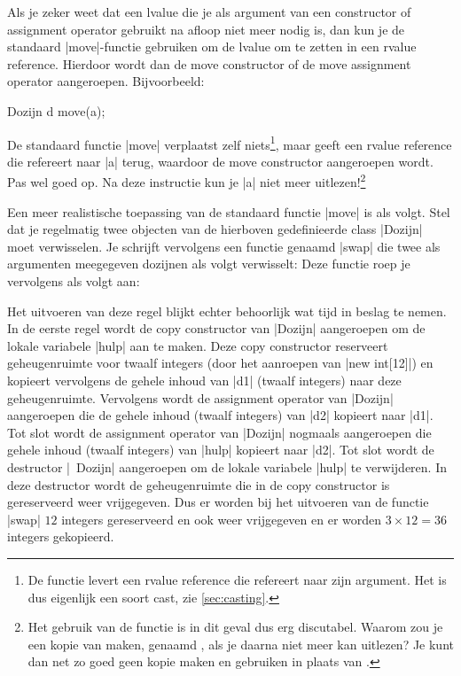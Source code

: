 \begin{cpplstShortInline}
Als je zeker weet dat een lvalue die je als argument van een constructor of assignment operator gebruikt na afloop niet meer nodig is, dan kun je de standaard |move|-functie gebruiken om de lvalue om te zetten in een rvalue reference.
Hierdoor wordt dan de move constructor of de move assignment operator aangeroepen.
Bijvoorbeeld:
\begin{cpplstfragment}
	Dozijn d {move(a)};
\end{cpplstfragment}
De standaard functie \label{std::move}|move| verplaatst zelf niets\footnote{%
	De functie levert een rvalue reference die refereert naar zijn argument. Het is dus eigenlijk een soort cast, zie \cref{sec:casting}.
}, maar geeft een rvalue reference die refereert naar |a| terug, waardoor de move constructor aangeroepen wordt.
Pas wel goed op. Na deze instructie kun je |a| niet meer uitlezen!\footnote{%
	Het gebruik van de functie  is in dit geval dus erg discutabel. Waarom zou je een kopie van  maken, genaamd , als je  daarna niet meer kan uitlezen? Je kunt dan net zo goed geen kopie maken en  gebruiken in plaats van .
} 

Een meer realistische toepassing van de standaard functie |move| is als volgt.
Stel dat je regelmatig twee objecten van de hierboven gedefinieerde class |Dozijn| moet verwisselen.
Je schrijft vervolgens een functie genaamd |swap| die twee als argumenten meegegeven dozijnen als volgt verwisselt:
Deze functie roep je vervolgens als volgt aan:

Het uitvoeren van deze regel blijkt echter behoorlijk wat tijd in beslag te nemen. 
In de eerste regel wordt de copy constructor van |Dozijn| aangeroepen om de lokale variabele |hulp| aan te maken.
Deze copy constructor reserveert geheugenruimte voor twaalf integers (door het aanroepen van |new int[12]|) en kopieert vervolgens de gehele inhoud van |d1| (twaalf integers) naar deze geheugenruimte.
Vervolgens wordt de assignment operator van |Dozijn| aangeroepen die de gehele inhoud (twaalf integers) van |d2| kopieert naar |d1|. Tot slot wordt de assignment operator van |Dozijn| nogmaals aangeroepen die gehele inhoud (twaalf integers) van |hulp| kopieert naar |d2|.
Tot slot wordt de destructor |~Dozijn| aangeroepen om de lokale variabele |hulp| te verwijderen.
In deze destructor wordt de geheugenruimte die in de copy constructor is gereserveerd weer vrijgegeven. 
Dus er worden bij het uitvoeren van de functie |swap| $12$ integers gereserveerd en ook weer vrijgegeven en er worden $3 \times{} 12 = 36$ integers gekopieerd.


\end{cpplstShortInline}
